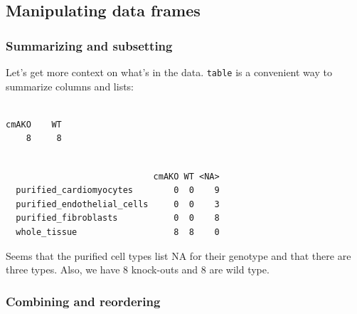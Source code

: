 \documentclass[
  letterpaper,
  DIV=11,
  numbers=noendperiod]{scrreprt}
\newenvironment{Shaded}{\begin{snugshade}}{\end{snugshade}}
\newcommand{\AttributeTok}[1]{\textcolor[rgb]{0.40,0.45,0.13}{#1}}
\newcommand{\CommentTok}[1]{\textcolor[rgb]{0.37,0.37,0.37}{#1}}
\newcommand{\FunctionTok}[1]{\textcolor[rgb]{0.28,0.35,0.67}{#1}}
\newcommand{\NormalTok}[1]{\textcolor[rgb]{0.00,0.23,0.31}{#1}}
\newcommand{\SpecialCharTok}[1]{\textcolor[rgb]{0.37,0.37,0.37}{#1}}
\newcommand{\StringTok}[1]{\textcolor[rgb]{0.13,0.47,0.30}{#1}}
\begin{document}
\subsection{Manipulating data frames}\label{manipulating-data-frames}

\subsubsection{Summarizing and
subsetting}\label{summarizing-and-subsetting}

Let's get more context on what's in the data. \texttt{table} is a
convenient way to summarize columns and lists:

\begin{Shaded}
\end{Shaded}

\begin{verbatim}

cmAKO    WT 
    8     8 
\end{verbatim}

\begin{Shaded}
\end{Shaded}

\begin{verbatim}
                            
                             cmAKO WT <NA>
  purified_cardiomyocytes        0  0    9
  purified_endothelial_cells     0  0    3
  purified_fibroblasts           0  0    8
  whole_tissue                   8  8    0
\end{verbatim}

Seems that the purified cell types list NA for their genotype and that
there are three types. Also, we have 8 knock-outs and 8 are wild type.

\subsubsection{Combining and reordering}\label{combining-and-reordering}
\end{document}
